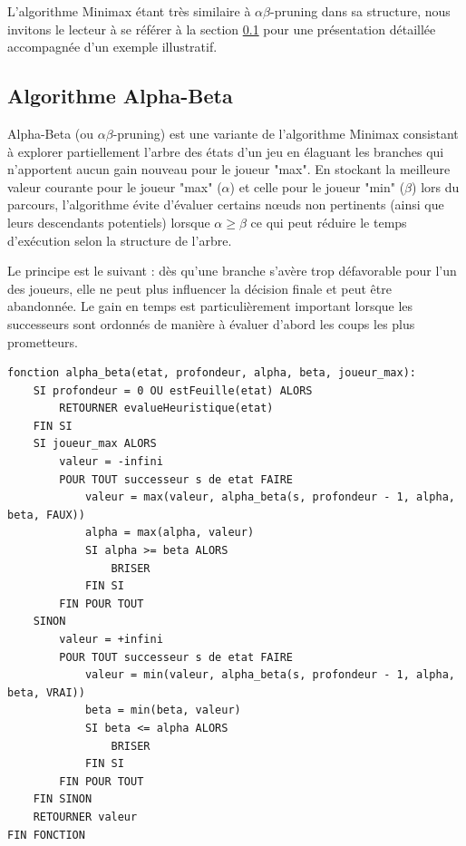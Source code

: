 \documentclass[11pt]{article}
\begin{document}
L'algorithme Minimax étant très similaire à $\alpha\beta$-pruning dans 
sa structure, nous invitons le lecteur à se référer à la section 
\ref{subsec:alphabeta} pour une présentation détaillée accompagnée 
d'un exemple illustratif.

\subsection{Algorithme Alpha-Beta}
\label{subsec:alphabeta}

Alpha-Beta (ou $\alpha\beta$-pruning) est une variante de l'algorithme Minimax consistant à explorer partiellement l'arbre des états d'un jeu en élaguant les branches qui n'apportent aucun gain nouveau pour le joueur "max".\cite{alpha_beta}
En stockant la meilleure valeur courante pour le joueur "max" ($\alpha$) et celle pour le joueur "min" ($\beta$) lors du parcours, l’algorithme évite d’évaluer certains nœuds non pertinents (ainsi que leurs descendants potentiels) lorsque $\alpha \geq \beta$ ce qui peut réduire le temps d’exécution selon la structure de l’arbre.

Le principe est le suivant : dès qu’une branche s’avère trop défavorable pour l’un des joueurs, elle ne peut plus influencer la décision finale et peut être abandonnée. Le gain en temps est particulièrement important lorsque les successeurs sont ordonnés de manière à évaluer d'abord les coups les plus prometteurs.

{\small
  \begin{verbatim}
fonction alpha_beta(etat, profondeur, alpha, beta, joueur_max):
    SI profondeur = 0 OU estFeuille(etat) ALORS
        RETOURNER evalueHeuristique(etat)
    FIN SI
    SI joueur_max ALORS
        valeur = -infini
        POUR TOUT successeur s de etat FAIRE
            valeur = max(valeur, alpha_beta(s, profondeur - 1, alpha, beta, FAUX))
            alpha = max(alpha, valeur)
            SI alpha >= beta ALORS
                BRISER
            FIN SI
        FIN POUR TOUT
    SINON
        valeur = +infini
        POUR TOUT successeur s de etat FAIRE
            valeur = min(valeur, alpha_beta(s, profondeur - 1, alpha, beta, VRAI))
            beta = min(beta, valeur)
            SI beta <= alpha ALORS
                BRISER
            FIN SI
        FIN POUR TOUT
    FIN SINON
    RETOURNER valeur
FIN FONCTION
  \end{verbatim}
}
\end{document}
